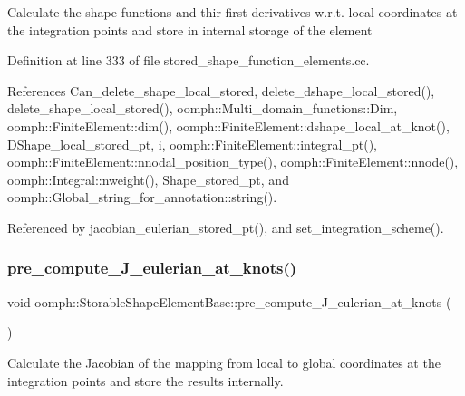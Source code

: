 Calculate the shape functions and thir first derivatives w.\+r.\+t. local coordinates at the integration points and store in internal storage of the element 

Definition at line 333 of file stored\+\_\+shape\+\_\+function\+\_\+elements.\+cc.



References Can\+\_\+delete\+\_\+shape\+\_\+local\+\_\+stored, delete\+\_\+dshape\+\_\+local\+\_\+stored(), delete\+\_\+shape\+\_\+local\+\_\+stored(), oomph\+::\+Multi\+\_\+domain\+\_\+functions\+::\+Dim, oomph\+::\+Finite\+Element\+::dim(), oomph\+::\+Finite\+Element\+::dshape\+\_\+local\+\_\+at\+\_\+knot(), D\+Shape\+\_\+local\+\_\+stored\+\_\+pt, i, oomph\+::\+Finite\+Element\+::integral\+\_\+pt(), oomph\+::\+Finite\+Element\+::nnodal\+\_\+position\+\_\+type(), oomph\+::\+Finite\+Element\+::nnode(), oomph\+::\+Integral\+::nweight(), Shape\+\_\+stored\+\_\+pt, and oomph\+::\+Global\+\_\+string\+\_\+for\+\_\+annotation\+::string().



Referenced by jacobian\+\_\+eulerian\+\_\+stored\+\_\+pt(), and set\+\_\+integration\+\_\+scheme().

\mbox{\label{classoomph_1_1StorableShapeElementBase_aa807b2f4c54bd0f48ed3b76070ad21b9}} 
\subsubsection{\texorpdfstring{pre\+\_\+compute\+\_\+\+J\+\_\+eulerian\+\_\+at\+\_\+knots()}{pre\_compute\_J\_eulerian\_at\_knots()}}
{\footnotesize\ttfamily void oomph\+::\+Storable\+Shape\+Element\+Base\+::pre\+\_\+compute\+\_\+\+J\+\_\+eulerian\+\_\+at\+\_\+knots (\begin{DoxyParamCaption}{ }\end{DoxyParamCaption})}



Calculate the Jacobian of the mapping from local to global coordinates at the integration points and store the results internally. 

